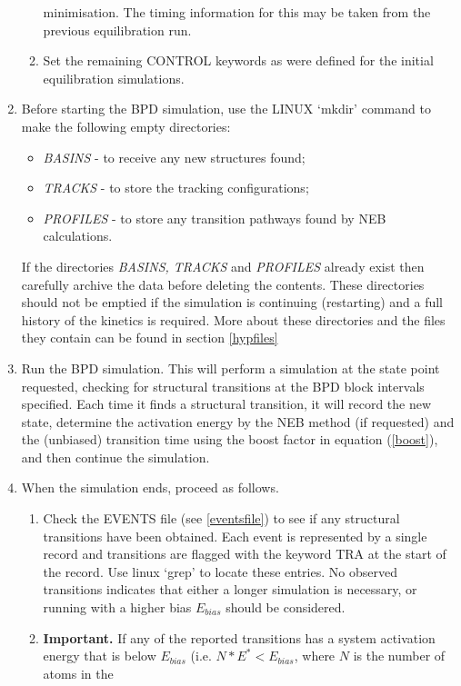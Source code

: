 \begin{enumerate}
\begin{enumerate}
      minimisation. The timing information for this may be taken from
      the previous equilibration run.
\item Set the remaining CONTROL keywords as were defined for the initial
      equilibration simulations.
\end{enumerate}
\item Before starting the BPD simulation, use the LINUX `mkdir' command to
      make the following empty directories: 
\begin{itemize}
   \item {\em BASINS} - to receive any new structures found;
   \item {\em TRACKS} - to store the tracking configurations;
   \item {\em PROFILES} - to store any transition pathways found by
   NEB calculations.
\end{itemize}
   If the directories {\em BASINS, TRACKS} and {\em PROFILES} already
   exist then carefully archive the data before deleting the
   contents. These directories should not be emptied if the simulation
   is continuing (restarting) and a full history of the kinetics is
   required. More about these directories and the files they contain
   can be found in section \ref{hypfiles}
 \item Run the BPD simulation. This will perform a simulation at the state
   point requested, checking for structural transitions at the BPD block
   intervals specified. Each time it finds a structural transition, it will
   record the new state, determine the activation energy by the NEB method (if
   requested) and the (unbiased) transition time using the boost factor in
   equation (\ref{boost}), and then continue the simulation.
\item When the simulation ends, proceed as follows.
\begin{enumerate}
\item Check the EVENTS file (see \ref{eventsfile}) to see if any structural
  transitions have been obtained. Each event is represented by a
  single record and transitions are flagged with the keyword TRA at
  the start of the record. Use linux `grep' to locate these entries. No
  observed transitions indicates that either a longer simulation is
  necessary, or running with a higher bias $E_{bias}$ should be
  considered.
\item {\bf Important.} If any of the reported transitions has a system
  activation energy that is below $E_{bias}$
  (i.e. $N*E^{*}<E_{bias}$, where $N$ is the number of atoms in the

\end{enumerate}
\end{enumerate}
